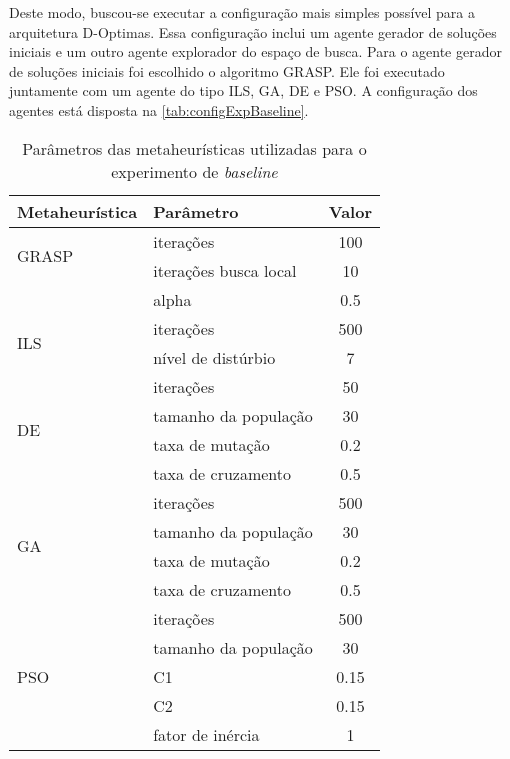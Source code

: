 Deste modo, buscou-se executar a configuração mais simples possível para a arquitetura D-Optimas. Essa configuração inclui um agente gerador de soluções iniciais e um outro agente explorador do espaço de busca. Para o agente gerador de soluções iniciais foi escolhido o algoritmo GRASP. Ele foi executado juntamente com um agente do tipo ILS, GA, DE e PSO. 
A configuração dos agentes está disposta na \autoref{tab:configExpBaseline}.

\begin{table}[ht!]
    \centering
    \caption{Parâmetros das metaheurísticas utilizadas para o experimento de \textit{baseline}}
    \begin{tabular}{llc}
        \toprule
         \textbf{Metaheurística} & \textbf{Parâmetro} & \textbf{Valor} \\
         \midrule
         \multirow{2}{*}{GRASP} & iterações                 & 100\\
                                & iterações busca local     & 10\\
                                & alpha                     & 0.5\\
         \midrule
         \multirow{2}{*}{ILS}    & iterações                 & 500\\
                                & nível de distúrbio        & 7\\
         \midrule
         \multirow{4}{*}{DE}    & iterações                 & 50\\
                                & tamanho da população      & 30\\
                                & taxa de mutação           & 0.2\\
                                & taxa de cruzamento        & 0.5\\
        \midrule
        \multirow{4}{*}{GA}     & iterações                 & 500\\
                                & tamanho da população      & 30\\
                                & taxa de mutação           & 0.2\\
                                & taxa de cruzamento        & 0.5\\
        \midrule
        \multirow{5}{*}{PSO}    & iterações                 & 500\\
                                & tamanho da população      & 30\\
                                & C1                        & 0.15\\
                                & C2                        & 0.15\\
                                & fator de inércia          & 1\\
        \bottomrule
    \end{tabular}
    \label{tab:configExpBaseline}
\end{table}

